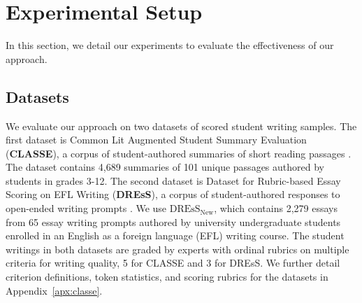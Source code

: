 \documentclass[11pt]{article}
\begin{document}
\section{Experimental Setup}
In this section, we detail our experiments to evaluate the effectiveness of our approach.

\subsection{Datasets}
We evaluate our approach on two datasets of scored student writing samples. 
The first dataset is Common Lit Augmented Student Summary Evaluation (\textbf{CLASSE}), a corpus of student-authored summaries of short reading passages \cite{crossley-etal-2024-world}. The dataset contains 4,689 summaries of 101 unique passages authored by students in grades 3-12. 
%
The second dataset is Dataset for Rubric-based Essay Scoring on EFL Writing (\textbf{DREsS}), a corpus of student-authored responses to open-ended writing prompts \cite{yoo_dress_2025}. We use $\text{DREsS}_{\text{New}}$, which contains 2,279 essays from 65 essay writing prompts authored by university undergraduate students enrolled in an English as a foreign language (EFL) writing course. The student writings in both datasets are graded by experts with ordinal rubrics on multiple criteria for writing quality, 5 for CLASSE and 3 for DREsS. We further detail criterion definitions, token statistics, and scoring rubrics for the datasets in Appendix~\ref{apx:classe}.


\end{document}
